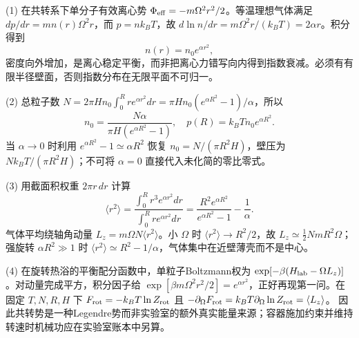 (1) 在共转系下单分子有效离心势 \(\Phi_{\rm eff}=-m\Omega^2r^2/2\)。等温理想气体满足 \(dp/dr=mn(r)\Omega^2r\)，而 \(p=nk_BT\)，故 \(d\ln n/dr=m\Omega^2r/(k_BT)=2\alpha r\)。积分得到
\[
\boxed{n(r)=n_0e^{\alpha r^2}},
\]
密度向外增加，是离心稳定平衡，而非把离心力错写向内得到指数衰减。必须有有限半径壁面，否则指数分布在无限平面不可归一。

(2) 总粒子数
\(N=2\pi Hn_0\int_0^R re^{\alpha r^2}dr=\pi Hn_0(e^{\alpha R^2}-1)/\alpha\)，所以
\[
n_0=\frac{N\alpha}{\pi H(e^{\alpha R^2}-1)},\quad
p(R)=k_BTn_0e^{\alpha R^2}.
\]
当 \(\alpha\to0\) 时利用 \(e^{\alpha R^2}-1\simeq\alpha R^2\) 恢复 \(n_0=N/(\pi R^2H)\)，壁压为 \(Nk_BT/(\pi R^2H)\)；不可将 \(\alpha=0\) 直接代入未化简的零比零式。

(3) 用截面积权重 \(2\pi r\,dr\) 计算
\[
\langle r^2\rangle
=\frac{\int_0^Rr^3e^{\alpha r^2}dr}{\int_0^Rr e^{\alpha r^2}dr}
=\boxed{\frac{R^2e^{\alpha R^2}}{e^{\alpha R^2}-1}-\frac1\alpha}.
\]
气体平均绕轴角动量 \(L_z=m\Omega N\langle r^2\rangle\)。小 \(\Omega\) 时 \(\langle r^2\rangle\to R^2/2\)，故 \(L_z\simeq\frac12NmR^2\Omega\)；强旋转 \(\alpha R^2\gg1\) 时 \(\langle r^2\rangle\simeq R^2-1/\alpha\)，气体集中在近壁薄壳而不是中心。

(4) 在旋转热浴的平衡配分函数中，单粒子Boltzmann权为 \(\exp[-\beta(H_{\rm lab}-\Omega L_z)]\)。对动量完成平方，积分因子给 \(\exp[\beta m\Omega^2r^2/2]=e^{\alpha r^2}\)，正好再现第一问。在固定 \(T,N,R,H\) 下 \(F_{\rm rot}=-k_BT\ln Z_{\rm rot}\) 且
\(-\partial_\Omega F_{\rm rot}=k_BT\partial_\Omega\ln Z_{\rm rot}=\langle L_z\rangle\)。
因此共转势是一种Legendre势而非实验室的额外真实能量来源；容器施加约束并维持转速时机械功应在实验室账本中另算。
